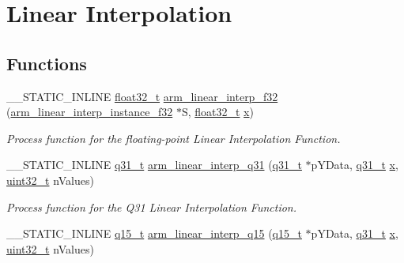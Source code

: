 \hypertarget{group___linear_interpolate}{\section{Linear Interpolation}
\label{group___linear_interpolate}
}
\subsection*{Functions}
\begin{DoxyCompactItemize}
\item 
\-\_\-\-\_\-\-S\-T\-A\-T\-I\-C\-\_\-\-I\-N\-L\-I\-N\-E \hyperlink{arm__math_8h_a4611b605e45ab401f02cab15c5e38715}{float32\-\_\-t} \hyperlink{group___linear_interpolate_gafd29f33d19cb1b3e1b5ddb9dddffd87b}{arm\-\_\-linear\-\_\-interp\-\_\-f32} (\hyperlink{structarm__linear__interp__instance__f32}{arm\-\_\-linear\-\_\-interp\-\_\-instance\-\_\-f32} $\ast$S, \hyperlink{arm__math_8h_a4611b605e45ab401f02cab15c5e38715}{float32\-\_\-t} \hyperlink{pios__opahrs__proto_8h_ad0da36b2558901e21e7a30f6c227a45e}{x})
\begin{DoxyCompactList}\small\item\em Process function for the floating-\/point Linear Interpolation Function. \end{DoxyCompactList}\item 
\-\_\-\-\_\-\-S\-T\-A\-T\-I\-C\-\_\-\-I\-N\-L\-I\-N\-E \hyperlink{arm__math_8h_adc89a3547f5324b7b3b95adec3806bc0}{q31\-\_\-t} \hyperlink{group___linear_interpolate_gac3594139f4f1fe548164bb39461f72c8}{arm\-\_\-linear\-\_\-interp\-\_\-q31} (\hyperlink{arm__math_8h_adc89a3547f5324b7b3b95adec3806bc0}{q31\-\_\-t} $\ast$p\-Y\-Data, \hyperlink{arm__math_8h_adc89a3547f5324b7b3b95adec3806bc0}{q31\-\_\-t} \hyperlink{pios__opahrs__proto_8h_ad0da36b2558901e21e7a30f6c227a45e}{x}, \hyperlink{stdint_8h_a435d1572bf3f880d55459d9805097f62}{uint32\-\_\-t} n\-Values)
\begin{DoxyCompactList}\small\item\em Process function for the Q31 Linear Interpolation Function. \end{DoxyCompactList}\item 
\-\_\-\-\_\-\-S\-T\-A\-T\-I\-C\-\_\-\-I\-N\-L\-I\-N\-E \hyperlink{arm__math_8h_ab5a8fb21a5b3b983d5f54f31614052ea}{q15\-\_\-t} \hyperlink{group___linear_interpolate_gad756229ce722b3a2f107a82878768b71}{arm\-\_\-linear\-\_\-interp\-\_\-q15} (\hyperlink{arm__math_8h_ab5a8fb21a5b3b983d5f54f31614052ea}{q15\-\_\-t} $\ast$p\-Y\-Data, \hyperlink{arm__math_8h_adc89a3547f5324b7b3b95adec3806bc0}{q31\-\_\-t} \hyperlink{pios__opahrs__proto_8h_ad0da36b2558901e21e7a30f6c227a45e}{x}, \hyperlink{stdint_8h_a435d1572bf3f880d55459d9805097f62}{uint32\-\_\-t} n\-Values)

\end{DoxyCompactItemize}
